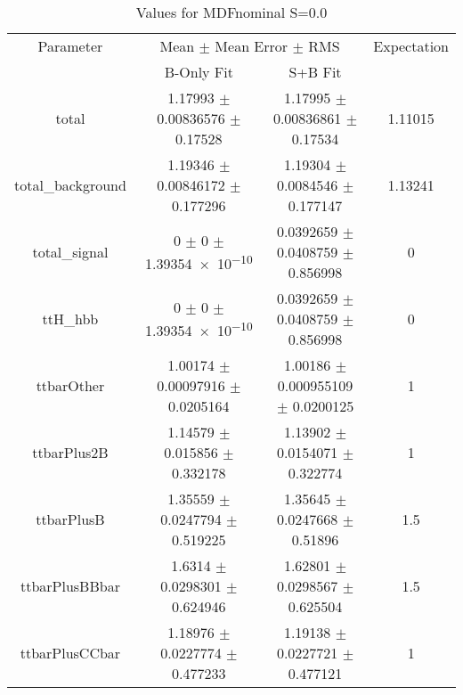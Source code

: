 \begin{table}
\centering
\caption{Values for MDFnominal S=0.0}
\begin{tabular}{cccc}
\toprule
Parameter & \multicolumn{2}{c}{Mean $\pm$ Mean Error $\pm$ RMS} & Expectation\\
 & B-Only Fit & S+B Fit & \\
\midrule
total & \num{1.17993} $\pm$ \num{0.00836576} $\pm$ \num{0.17528} & \num{1.17995} $\pm$ \num{0.00836861} $\pm$ \num{0.17534} & \num{1.11015}\\
total\_background & \num{1.19346} $\pm$ \num{0.00846172} $\pm$ \num{0.177296} & \num{1.19304} $\pm$ \num{0.0084546} $\pm$ \num{0.177147} & \num{1.13241}\\
total\_signal & \num{0} $\pm$ \num{0} $\pm$ \num{1.39354e-10} & \num{0.0392659} $\pm$ \num{0.0408759} $\pm$ \num{0.856998} & \num{0}\\
ttH\_hbb & \num{0} $\pm$ \num{0} $\pm$ \num{1.39354e-10} & \num{0.0392659} $\pm$ \num{0.0408759} $\pm$ \num{0.856998} & \num{0}\\
ttbarOther & \num{1.00174} $\pm$ \num{0.00097916} $\pm$ \num{0.0205164} & \num{1.00186} $\pm$ \num{0.000955109} $\pm$ \num{0.0200125} & \num{1}\\
ttbarPlus2B & \num{1.14579} $\pm$ \num{0.015856} $\pm$ \num{0.332178} & \num{1.13902} $\pm$ \num{0.0154071} $\pm$ \num{0.322774} & \num{1}\\
ttbarPlusB & \num{1.35559} $\pm$ \num{0.0247794} $\pm$ \num{0.519225} & \num{1.35645} $\pm$ \num{0.0247668} $\pm$ \num{0.51896} & \num{1.5}\\
ttbarPlusBBbar & \num{1.6314} $\pm$ \num{0.0298301} $\pm$ \num{0.624946} & \num{1.62801} $\pm$ \num{0.0298567} $\pm$ \num{0.625504} & \num{1.5}\\
ttbarPlusCCbar & \num{1.18976} $\pm$ \num{0.0227774} $\pm$ \num{0.477233} & \num{1.19138} $\pm$ \num{0.0227721} $\pm$ \num{0.477121} & \num{1}\\
\bottomrule
\end{tabular}
\end{table}